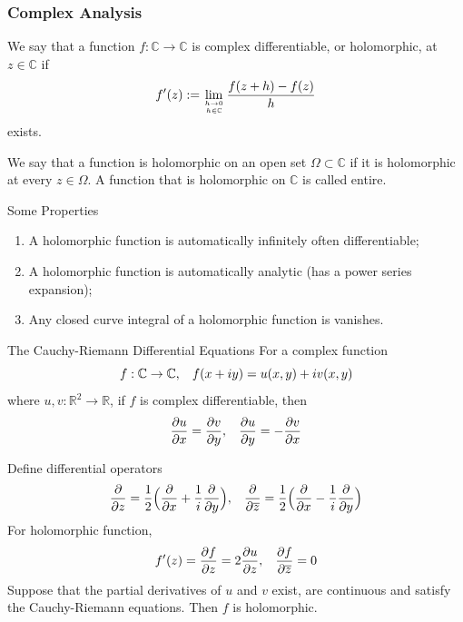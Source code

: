 \documentclass{beamer}
\begin{document}
\begin{frame}
\frametitle{Complex Analysis}
We say that a function $f : \mathbb{C}\rightarrow\mathbb{C}$ is complex
differentiable, or holomorphic, at $z \in\mathbb{C}$ if
$$f'(z):=\lim_{h\rightarrow0\atop h\in\mathbb{C}}\dfrac{f(z+h)-f(z)}{h}$$
exists.
\begin{block}{}
We say that a function is holomorphic on an open set $\Omega\subset \mathbb{C}$ if it is holomorphic at every $z \in \Omega$. A function that is holomorphic on $\mathbb{C}$ is called entire.
\end{block}

\end{frame}

\begin{frame}
\begin{block}{Some Properties}
\begin{enumerate}
\item A holomorphic function is automatically infinitely often differentiable;
\item A holomorphic function is automatically analytic (has a power series
expansion);
\item Any closed curve integral of a holomorphic function is vanishes.
\end{enumerate}
\end{block}

\end{frame}

\begin{frame}
\begin{block}{The Cauchy-Riemann Differential Equations}
For a complex function
$$f:\mathbb{C}\rightarrow\mathbb{C},\hspace{3mm}f(x+iy)=u(x,y)+iv(x,y)$$
where $u,v:\mathbb{R}^2\rightarrow\mathbb{R}$, if $f$ is complex differentiable, then
$$\dfrac{\partial u}{\partial x}=\dfrac{\partial v}{\partial y},\hspace{3mm}\dfrac{\partial u}{\partial y}=-\dfrac{\partial v}{\partial x}$$

\end{block}

\end{frame}

\begin{frame}
\begin{block}{}
Define differential operators
$$\dfrac{\partial }{\partial z}=\dfrac{1}{2}\Big(\dfrac{\partial }{\partial x}+\dfrac{1}{i}\dfrac{\partial }{\partial y}\Big),\hspace{3mm}\dfrac{\partial }{\partial \overline{z}}=\dfrac{1}{2}\Big(\dfrac{\partial }{\partial x}-\dfrac{1}{i}\dfrac{\partial }{\partial y}\Big)$$
For holomorphic function,
$$f'(z)=\dfrac{\partial f}{\partial z}=2\dfrac{\partial u}{\partial z},\hspace{3mm} \dfrac{\partial f}{\partial \overline{z}}=0$$
Suppose that the partial derivatives of $u$ and $v$ exist, are continuous and satisfy the Cauchy-Riemann equations. Then $f$ is holomorphic.
\end{block}
\end{frame}
\end{document}
